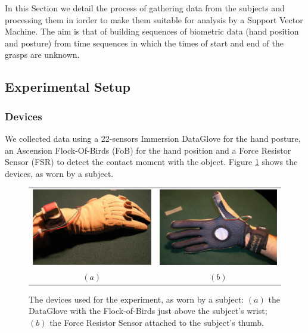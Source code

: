 In this Section we detail the process of gathering data from the
subjects and processing them in iorder to make them suitable for
analysis by a Support Vector Machine. The aim is that of building
sequences of biometric data (hand position and posture) from time
sequences in which the times of start and end of the grasps are
unknown.

\subsection{Experimental Setup}

\subsubsection*{Devices}

We collected data using a 22-sensors Immersion DataGlove for the hand
posture, an Ascension Flock-Of-Birds (FoB) for the hand position and a
Force Resistor Sensor (FSR) to detect the contact moment with the
object. Figure \ref{fig:devices} shows the devices, as worn by a
subject.

\begin{figure}[htbp]
  \begin{center}
    \begin{tabular}{cc}
      \includegraphics[width=0.45\linewidth]{devices1.eps} &
      \includegraphics[width=0.45\linewidth]{devices2.eps} \\
      $(a)$ & $(b)$
    \end{tabular}
    \caption{The devices used for the experiment, as worn by a
    subject: $(a)$ the DataGlove with the Flock-of-Birds just above the
    subject's wrist; $(b)$ the Force Resistor Sensor attached to the
    subject's thumb.}
    \label{fig:devices}
  \end{center}
\end{figure}

